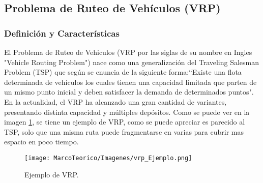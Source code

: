 \subsection {Problema de Ruteo de Vehículos (VRP)}

\subsubsection {Definición y Características}
El Problema de Ruteo de Vehiculos (VRP por las siglas de su nombre en Ingles "Vehicle Routing Problem") nace como una generalización del Traveling Salesman Problem (TSP) que según \cite{[DANTZIG-RAMSER]} se enuncia de la siguiente forma:“Existe una flota determinada de vehículos los cuales tienen una capacidad limitada que parten de un mismo punto inicial y deben satisfacer la demanda de determinados puntos".\\
En la actualidad, el VRP ha alcanzado una gran cantidad de variantes, presentando distinta capacidad y múltiples depósitos.
Como se puede ver en la imagen  \ref{fig:Ejemplo-VRP}, se tiene un ejemplo de VRP, como se puede apreciar es parecido al TSP, solo que una misma ruta puede fragmentarse en varias para cubrir mas espacio en poco tiempo.

    \begin{figure}[hbtp]
        \centering
            \texttt{[image: MarcoTeorico/Imagenes/vrp\_Ejemplo.png]}
            \caption{Ejemplo de VRP.}                       
            \label{fig:Ejemplo-VRP}
    \end{figure} 

